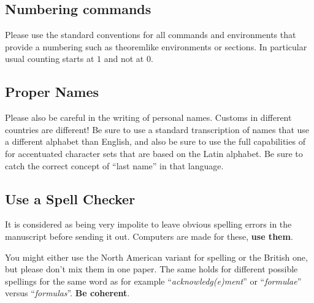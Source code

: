 \documentclass[%
]{algotel}
\begin{document}
\subsection{Numbering commands}
\label{sec:numbering}

Please use the standard conventions for all commands and environments
that provide a numbering such as theoremlike environments or
sections. In particular usual counting starts at $1$ and not at
$0$. 



\subsection{Proper Names}
\label{sec:names}
Please also be careful in the writing of personal names. Customs in
different countries are different! Be sure to use a standard
transcription of names that use a different alphabet than English, and 
also be sure to use the full capabilities of \LaTeXe for accentuated
character sets that are based on the Latin alphabet. Be sure to catch
the correct concept of ``last name'' in that language.


\subsection{Use a Spell Checker}
\label{sec:check}

It is considered as being very impolite to leave obvious spelling
errors in the manuscript before sending it out. Computers are made for 
these, \textbf{use them}.

You might either use the North American variant for spelling or the
British one, but please don't mix them in one paper. The same holds
for different possible spellings for the same word as for example
``\emph{acknowledg(e)ment}'' or ``\emph{formulae}'' versus
``\emph{formulas}''. \textbf{Be coherent}.
\end{document}
